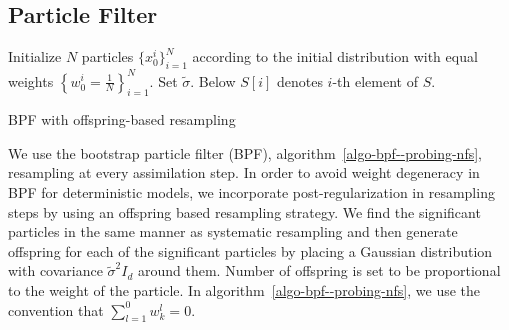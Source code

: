 \subsection{Particle Filter} \label{ssec-pf--probing-nfs}
\begin{algorithm}[!t]
Initialize $N$ particles $\{x_0^i\}_{i=1}^N$ according to the initial distribution with equal weights $\left\{w_0^i=\frac{1}{N}\right\}_{i=1}^N$. Set $\tilde\sigma$. Below $S[i]$ denotes $i$-th element of $S$.\\
 \caption{BPF with offspring-based resampling}
\label{algo-bpf--probing-nfs}
\end{algorithm}
We use the bootstrap particle filter (BPF), algorithm~\ref{algo-bpf--probing-nfs}, resampling at every assimilation step. In order to avoid weight degeneracy in BPF for deterministic models, we incorporate post-regularization \cite{farchi2018comparison} in resampling steps by using an offspring based resampling strategy. We find the significant particles in the same manner as systematic resampling \cite{doucet2009tutorial} and then generate offspring for each of the significant particles by placing a Gaussian distribution with covariance $\tilde\sigma^2I_d$ around them. Number of offspring is set to be proportional to the weight of the particle. In algorithm~\ref{algo-bpf--probing-nfs}, we use the convention that $\sum_{l=1}^0w^l_k=0$.
